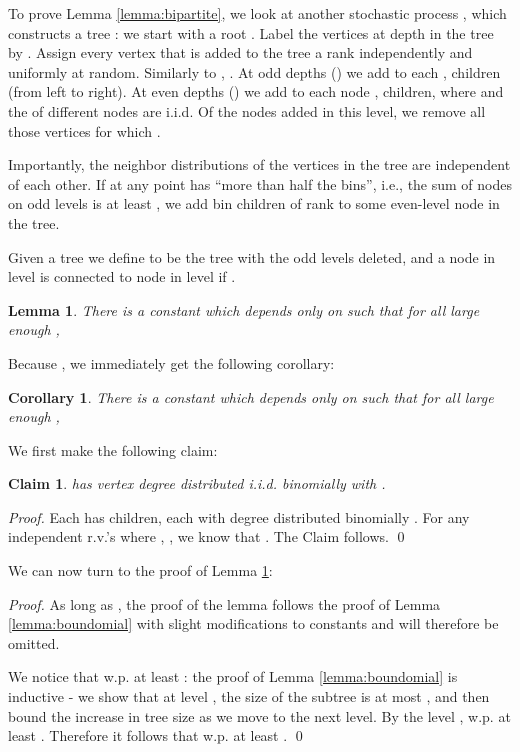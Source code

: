 \documentclass[english, oribibl]{llncs}
\newtheorem{lemma}[theorem]{Lemma}
\newtheorem{corollary}[theorem]{Corollary}
\newtheorem{claim}[theorem]{Claim}
\begin{document}
\label{bipartite_proof}

To prove Lemma \ref{lemma:bipartite}, we look at another stochastic process , which constructs a tree :
we start with  a root . Label the vertices at depth  in
the tree by . Assign every vertex  that is added to the tree a rank  independently and uniformly at random. Similarly to , . At odd depths () we add to each ,  children (from left to right).  At even depths () we add to each node ,  children, where  and the  of different nodes are i.i.d. Of the nodes added in this level, we remove all those vertices  for which .





Importantly, the neighbor distributions of the vertices in the tree are independent of each other.
If at any point  has ``more than half the bins'', i.e., the sum of nodes on odd levels is at least , we add  bin children of rank  to some even-level node in the tree.

Given a tree  we define  to be the tree  with the
odd levels deleted, and a node  in level  is connected to node  in level  if .


\begin{lemma}
\label{lemma:T'}
There is a constant  which depends only on  such that for all large enough ,

\end{lemma}

Because , we immediately get the following corollary:

\begin{corollary}
\label{corr:T'}
There is a constant  which depends only on  such that for all large enough ,

\end{corollary}


We first make the following claim:
\begin{claim}
  has vertex degree distributed i.i.d. binomially with   .
\end{claim}

\begin{proof}
Each  has  children, each with degree distributed binomially . 
 For any independent r.v.'s  where , , we know that
 .  The Claim follows. \qed
\end{proof}


We can now turn to the proof of Lemma  \ref{lemma:T'}:

\begin{proof}

As long as , the proof of the lemma follows the proof of Lemma \ref{lemma:boundomial}
with slight modifications to constants and will therefore be omitted. 

We notice that  w.p. at least : the proof of  Lemma \ref{lemma:boundomial} is inductive - we show that at level ,
the size of the subtree is at most , and then bound the increase in tree size
as we move to the next level. 
By the level ,  w.p. at least . Therefore 
it follows that  w.p. at least . \qed
\end{proof}
\end{document}
